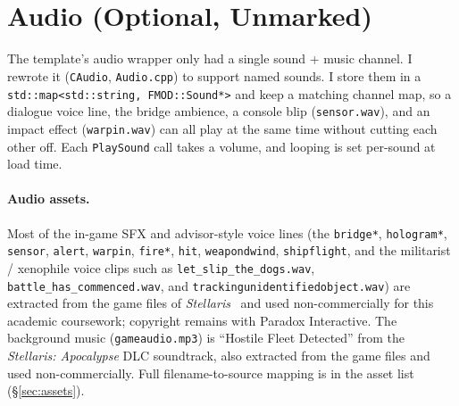 \documentclass[11pt,a4paper]{article}
\begin{document}
\begin{figure}[H]
  \hfill
  \\[1em]
  \hfill
  \\[1em]
\end{figure}

\section{Audio (Optional, Unmarked)}

The template's audio wrapper only had a single sound + music channel. I
rewrote it (\texttt{CAudio}, \texttt{Audio.cpp}) to support named sounds.
I store them in a \texttt{std::map<std::string,\,FMOD::Sound*>} and keep a
matching channel map, so a dialogue voice line, the bridge ambience, a
console blip (\texttt{sensor.wav}), and an impact effect
(\texttt{warpin.wav}) can all play at the same time without cutting each
other off. Each \texttt{PlaySound} call takes a volume, and looping is set
per-sound at load time.

\paragraph{Audio assets.} Most of the in-game SFX and advisor-style voice
lines (the \texttt{bridge*}, \texttt{hologram*}, \texttt{sensor},
\texttt{alert}, \texttt{warpin}, \texttt{fire*}, \texttt{hit},
\texttt{weapondwind}, \texttt{shipflight}, and the militarist /
xenophile voice clips such as \texttt{let\_slip\_the\_dogs.wav},
\texttt{battle\_has\_commenced.wav}, and
\texttt{trackingunidentifiedobject.wav}) are extracted from the game files
of \emph{Stellaris}~\cite{stellaris} and used non-commercially for this
academic coursework; copyright remains with Paradox Interactive. The
background music (\texttt{gameaudio.mp3}) is ``Hostile Fleet Detected''
from the \emph{Stellaris: Apocalypse} DLC soundtrack, also extracted from
the game files and used non-commercially. Full filename-to-source mapping
is in the asset list (\S\ref{sec:assets}).
\end{document}
